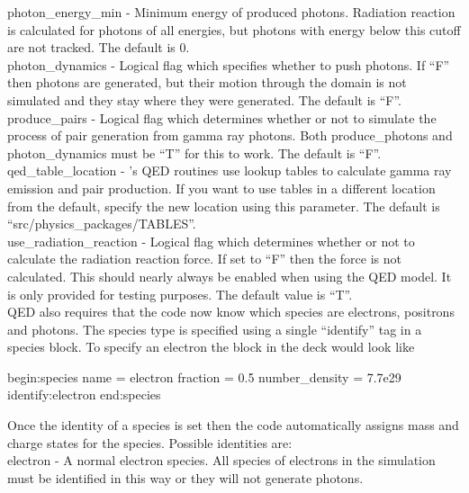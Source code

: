 {\emphtext photon\_energy\_min} - Minimum energy of produced photons.
  Radiation reaction is calculated for photons of all energies, but photons
  with energy below this cutoff are not tracked.  The default is 0.\\

{\emphtext photon\_dynamics} - Logical flag which specifies whether to push
  photons.  If ``F'' then photons are generated, but their motion through the
  domain is not simulated and they stay where they were generated. The default
  is ``F''.\\

{\emphtext produce\_pairs} - Logical flag which determines whether or not to
  simulate the process of pair generation from gamma ray photons.  Both
  produce\_photons and photon\_dynamics must be ``T'' for this to work. The
  default is ``F''.\\

{\emphtext qed\_table\_location} - {\EPOCH}'s QED routines use lookup tables to
  calculate gamma ray emission and pair production. If you want to use tables
  in a different location from the default, specify the new location using
  this parameter.  The default is ``src/physics\_packages/TABLES''.\\

{\emphtext use\_radiation\_reaction} - Logical flag which determines whether
  or not to calculate the radiation reaction force. If set to ``F'' then
  the force is not calculated. This should nearly always be enabled when
  using the QED model. It is only provided for testing purposes.
  The default value is ``T''.\\

QED also requires that the code now know which species are electrons,
positrons and photons. The species type is specified using a single
``identify'' tag in a species block. To specify an electron the block in the
deck would look like

\begin{boxverbatim}
begin:species
   name = electron
   fraction = 0.5
   number_density = 7.7e29
   identify:electron
end:species
\end{boxverbatim}

Once the identity of a species is set then the code automatically assigns
mass and charge states for the species.
Possible identities are:\\

{\emphtext electron} - A normal electron species. All species of electrons in
  the simulation must be identified in this way or they will not generate
  photons.\\

